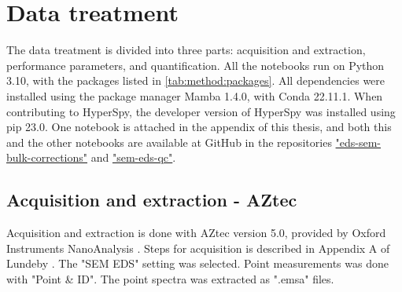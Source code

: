 






















\clearpage

\section{Data treatment}
\label{method:data_treatment}

The data treatment is divided into three parts: acquisition and extraction, performance parameters, and quantification.
All the notebooks run on Python 3.10, with the packages listed in \cref{tab:method:packages}.
All dependencies were installed using the package manager Mamba 1.4.0, with Conda 22.11.1.
When contributing to HyperSpy, the developer version of HyperSpy was installed using pip 23.0.
One notebook is attached in the appendix of this thesis, and both this and the other notebooks are available at GitHub in the repositories \href{https://github.com/brynjarmorka/eds-sem-bulk-corrections}{"eds-sem-bulk-corrections"} and \href{https://github.com/brynjarmorka/sem-eds-qc}{"sem-eds-qc"}. 




\subsection{Acquisition and extraction - AZtec}
\label{method:data_treatment:aztec}

Acquisition and extraction is done with AZtec version 5.0, provided by Oxford Instruments NanoAnalysis \cite{aztec_manual}.
Steps for acquisition is described in Appendix A of Lundeby \cite{lundeby_improving_2019}.
The "SEM EDS" setting was selected.
Point measurements was done with "Point \& ID".
The point spectra was extracted as ".emsa" files.

